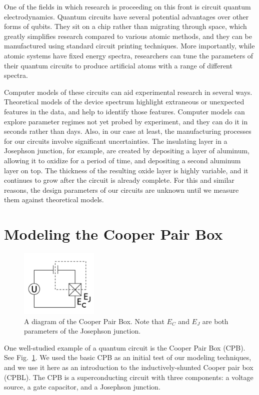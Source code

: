 \documentclass[twocolumn]{revtex4}
\newcommand{\figwidth}{0.33\textwidth}
\begin{document}
One of the fields in which research is proceeding on this front is
circuit quantum electrodynamics. Quantum circuits have several
potential advantages over other forms of qubits. They sit on a chip
rather than migrating through space, which greatly simplifies research
compared to various atomic methods, and they can be manufactured using
standard circuit printing techniques. More importantly, while atomic
systems have fixed energy spectra, researchers can tune the parameters
of their quantum circuits to produce artificial atoms with a range of
different spectra.

Computer models of these circuits can aid experimental research in
several ways. Theoretical models of the device spectrum highlight
extraneous or unexpected features in the data, and help to identify
those features. Computer models can explore parameter regimes not yet
probed by experiment, and they can do it in seconds rather than
days. Also, in our case at least, the manufacturing processes for our
circuits involve significant uncertainties. The insulating layer in a
Josephson junction, for example, are created by depositing a layer of
aluminum, allowing it to oxidize for a period of time, and depositing
a second aluminum layer on top. The thickness of the resulting oxide
layer is highly variable, and it continues to grow after the circuit
is already complete. For this and similar reasons, the design
parameters of our circuits are unknown until we measure them against
theoretical models.

\section{Modeling the Cooper Pair Box}

\begin{figure}
  \includegraphics[width=\figwidth]{CPB-circuit.png}
  \caption{A diagram of the Cooper Pair Box. Note that $E_C$ and $E_J$
    are both parameters of the Josephson junction.}
  \label{cpb-circuit}
\end{figure}

One well-studied example of a quantum circuit is the Cooper Pair Box
(CPB). See Fig.~\ref{cpb-circuit}. We used the basic CPB as an initial
test of our modeling techniques, and we use it here as an introduction
to the inductively-shunted Cooper pair box (CPBL). The CPB is a
superconducting circuit with three components: a voltage source, a
gate capacitor, and a Josephson junction.
\end{document}
